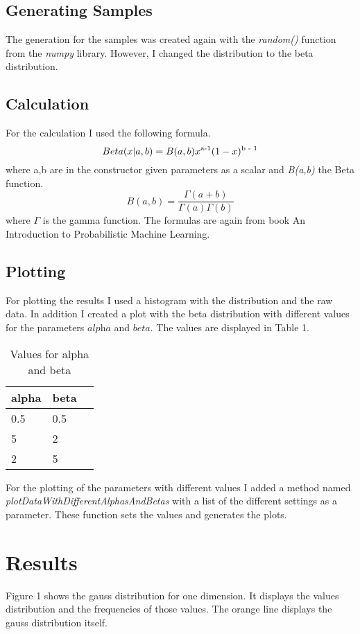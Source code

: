 \documentclass[10pt, a4paper, twocolumn]{article} %
\begin{document}
\subsection{Generating Samples}
The generation for the samples was created again with the \textit{random()} function from the \textit{numpy} library. However, I changed the distribution to the beta distribution. 

\subsection{Calculation}
For the calculation I used the following formula. 
\[
Beta(x|a,b) = B(a,b)x\textsuperscript{a-1}(1 - x)\textsuperscript{b - 1}
\]
where a,b are in the constructor given parameters as a scalar and \textit{B(a,b)} the Beta function. 
\[
B(a,b) = \frac{\Gamma(a + b)}{\Gamma(a)\Gamma(b)}
\]
where $\Gamma$ is the gamma function. The formulas are again from book An Introduction to Probabilistic Machine Learning.  
\citep{bookMachineLearning}


\subsection{Plotting}
For plotting the results I used a histogram with the distribution and the raw data. In addition I created a plot with the beta distribution with different values for the parameters $\textit{alpha}$ and $\textit{beta}$. The values are displayed in Table 1. 
\begin{table}[htbp]
    \label{tab:alphaBetaParameters}
	\caption{Values for alpha and beta}
	\centering
	\begin{tabular}{llr}
		\cmidrule(r){1-2}
		alpha & beta \\
		\midrule
		0.5 & 0.5 \\
		5 & 2 \\
		2 & 5 \\
		\bottomrule
	\end{tabular}
\end{table}
For the plotting of the parameters with different values I added a method named \textit{plotDataWithDifferentAlphasAndBetas} with a list of the different settings as a parameter. These function sets the values and generates the plots. 

\section{Results}
Figure 1 shows the gauss distribution for one dimension. It displays the values distribution and the frequencies of those values. The orange line displays the gauss distribution itself.
\end{document}
